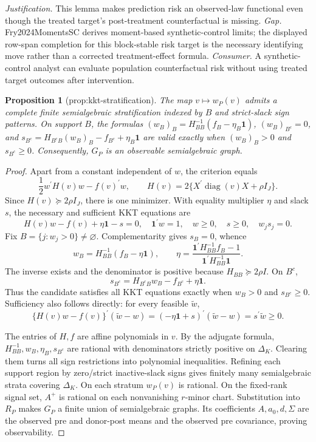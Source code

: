 \documentclass{article}
\newtheorem{proposition}{Proposition}
\begin{document}
\par\smallskip\noindent \textit{Justification.} This lemma makes prediction risk an observed-law functional even though the treated target's post-treatment counterfactual is missing. \textit{Gap.} Fry2024MomentsSC derives moment-based synthetic-control limits; the displayed row-span completion for this block-stable risk target is the necessary identifying move rather than a corrected treatment-effect formula. \textit{Consumer.} A synthetic-control analyst can evaluate population counterfactual risk without using treated target outcomes after intervention.

\begin{proposition}[prop:kkt-stratification]\label{prop:kkt-stratification}
The map \(v\mapsto w_P(v)\) admits a complete finite semialgebraic stratification indexed by \(B\) and strict-slack sign patterns. On support \(B\), the formulas \((w_B)_B=H_{BB}^{-1}(f_B-\eta_B\mathbf 1)\), \((w_B)_{B^c}=0\), and \(s_{B^c}=H_{B^cB}(w_B)_B-f_{B^c}+\eta_B\mathbf 1\) are valid exactly when \((w_B)_B>0\) and \(s_{B^c}\ge0\). Consequently, \(G_P\) is an observable semialgebraic graph.
\end{proposition}
\begin{proof}
Apart from a constant independent of \(w\), the criterion equals
\[
\frac12w^\prime H(v)w-f(v)^\prime w,\qquad H(v)=2\{X^\prime\operatorname{diag}(v)X+\rho I_J\}.
\]
Since \(H(v)\succeq2\rho I_J\), there is one minimizer. With equality multiplier \(\eta\) and slack \(s\), the necessary and sufficient KKT equations are
\[
H(v)w-f(v)+\eta\mathbf1-s=0,\quad \mathbf1^\prime w=1,\quad w\geq0,\quad s\geq0,\quad w_js_j=0.
\]
Fix \(B=\{j:w_j>0\}\neq\varnothing\). Complementarity gives \(s_B=0\), whence
\[
w_B=H_{BB}^{-1}(f_B-\eta\mathbf1),\qquad
\eta=\frac{\mathbf1^\prime H_{BB}^{-1}f_B-1}{\mathbf1^\prime H_{BB}^{-1}\mathbf1}.
\]
The inverse exists and the denominator is positive because \(H_{BB}\succeq2\rho I\). On \(B^c\),
\[
s_{B^c}=H_{B^cB}w_B-f_{B^c}+\eta\mathbf1.
\]
Thus the candidate satisfies all KKT equations exactly when \(w_B>0\) and \(s_{B^c}\geq0\). Sufficiency also follows directly: for every feasible \(\widetilde w\),
\[
\{H(v)w-f(v)\}^\prime(\widetilde w-w)=(-\eta\mathbf1+s)^\prime(\widetilde w-w)=s^\prime\widetilde w\geq0.
\]

The entries of \(H,f\) are affine polynomials in \(v\). By the adjugate formula, \(H_{BB}^{-1},w_B,\eta_B,s_{B^c}\) are rational with denominators strictly positive on \(\Delta_K\). Clearing them turns all sign restrictions into polynomial inequalities. Refining each support region by zero/strict inactive-slack signs gives finitely many semialgebraic strata covering \(\Delta_K\). On each stratum \(w_P(v)\) is rational. On the fixed-rank signal set, \(A^+\) is rational on each nonvanishing \(r\)-minor chart. Substitution into \(R_P\) makes \(G_P\) a finite union of semialgebraic graphs. Its coefficients \(A,a_0,d,\Sigma\) are the observed pre and donor-post means and the observed pre covariance, proving observability.
\end{proof}
\end{document}
